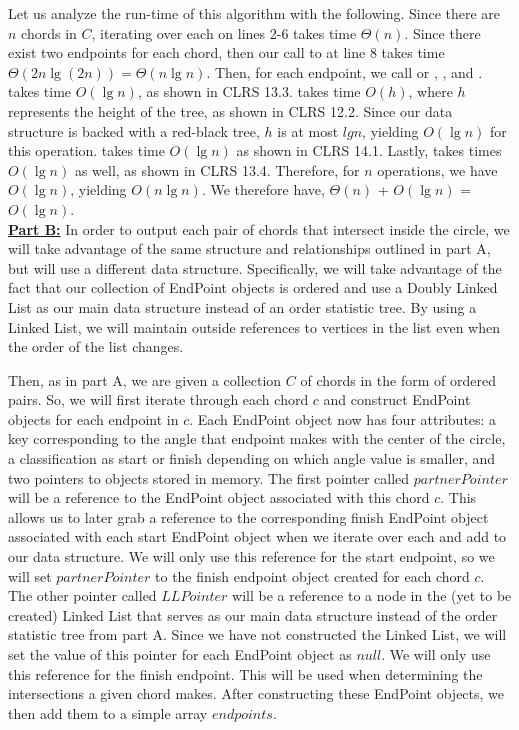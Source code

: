 \documentclass[11pt]{article}
\begin{document}
Let us analyze the run-time of this algorithm with the following. Since there are $n$ chords in $C$, iterating over each on lines 2-6 takes time $\Theta(n)$. Since there exist two endpoints for each chord, then our call to  at line 8 takes time $\Theta(2n\lg(2n)) = \Theta(n\lg{n})$. Then, for each endpoint, we call  or , , and .  takes time $O(\lg{n})$, as shown in CLRS 13.3.  takes time $O(h)$, where $h$ represents the height of the tree, as shown in CLRS 12.2. Since our data structure is backed with a red-black tree, $h$ is at most $lg{n}$, yielding $O(\lg{n})$ for this operation.  takes time $O(\lg{n})$ as shown in CLRS 14.1. Lastly,  takes times $O(\lg{n})$ as well, as shown in CLRS 13.4. Therefore, for $n$ operations, we have $O(\lg{n})$, yielding $O(n\lg{n})$. We therefore have, $\Theta(n)$ + $O(\lg{n})$ = $O(\lg{n})$.\\

\textbf{\underline{Part B:}} In order to output each pair of chords that intersect inside the circle, we will take advantage of the same structure and relationships outlined in part A, but will use a different data structure. Specifically, we will take advantage of the fact that our collection of EndPoint objects is ordered and use a Doubly Linked List as our main data structure instead of an order statistic tree. By using a Linked List, we will maintain outside references to vertices in the list even when the order of the list changes.

Then, as in part A, we are given a collection $C$ of chords in the form of ordered pairs. So, we will first iterate through each chord $c$ and construct EndPoint objects for each endpoint in $c$. Each EndPoint object now has four attributes: a key corresponding to the angle that endpoint makes with the center of the circle, a classification as start or finish depending on which angle value is smaller, and two pointers to objects stored in memory. The first pointer called $partnerPointer$ will be a reference to the EndPoint object associated with this chord $c$. This allows us to later grab a reference to the corresponding finish EndPoint object associated with each start EndPoint object when we iterate over each and add to our data structure. We will only use this reference for the start endpoint, so we will set $partnerPointer$ to the finish endpoint object created for each chord $c$. The other pointer called $LLPointer$ will be a reference to a node in the (yet to be created) Linked List that serves as our main data structure instead of the order statistic tree from part A. Since we have not constructed the Linked List, we will set the value of this pointer for each EndPoint object as $null$. We will only use this reference for the finish endpoint. This will be used when determining the intersections a given chord makes. After constructing these EndPoint objects, we then add them to a simple array $endpoints$.
\end{document}
